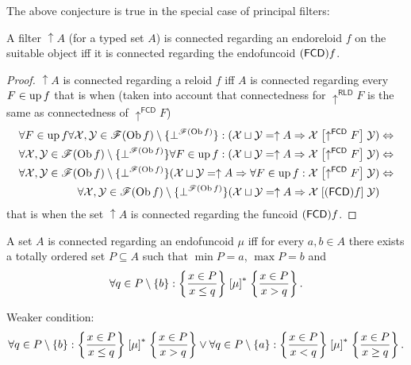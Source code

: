 The above conjecture is true in the special case of principal filters:
\begin{prop}
A filter $\uparrow A$ (for a typed set $A$) is connected regarding
an endoreloid $f$ on the suitable object iff it is connected regarding the endofuncoid $(\mathsf{FCD}) f$.\end{prop}
\begin{proof}
$\uparrow A$ is connected regarding a reloid $f$ iff $A$
is connected regarding every $F\in\operatorname{up} f$ that is when (taken into
account that connectedness for $\uparrow^{\mathsf{RLD}}F$ is the
same as connectedness of $\uparrow^{\mathsf{FCD}}F$)
\begin{align*}
\forall F\in\operatorname{up} f\forall\mathcal{X},\mathcal{Y}\in\mathscr{F}(\operatorname{Ob} f)\setminus\{\bot^{\mathscr{F}(\operatorname{Ob} f)}\}:(\mathcal{X}\sqcup\mathcal{Y}=\uparrow A\Rightarrow\mathcal{X}\mathrel{\left[\uparrow^{\mathsf{FCD}}F\right]}\mathcal{Y}) & \Leftrightarrow\\
\forall\mathcal{X},\mathcal{Y}\in\mathscr{F}(\operatorname{Ob} f)\setminus\{\bot^{\mathscr{F}(\operatorname{Ob} f)}\}\forall F\in\operatorname{up} f:(\mathcal{X}\sqcup\mathcal{Y}=\uparrow A\Rightarrow\mathcal{X}\mathrel{\left[\uparrow^{\mathsf{FCD}}F\right]}\mathcal{Y}) & \Leftrightarrow\\
\forall\mathcal{X},\mathcal{Y}\in\mathscr{F}(\operatorname{Ob} f)\setminus\{\bot^{\mathscr{F}(\operatorname{Ob} f)}\}(\mathcal{X}\sqcup\mathcal{Y}=\uparrow A\Rightarrow\forall F\in\operatorname{up} f:\mathcal{X}\mathrel{\left[\uparrow^{\mathsf{FCD}}F\right]}\mathcal{Y}) & \Leftrightarrow\\
\forall\mathcal{X},\mathcal{Y}\in\mathscr{F}(\operatorname{Ob} f)\setminus\{\bot^{\mathscr{F}(\operatorname{Ob} f)}\}(\mathcal{X}\sqcup\mathcal{Y}=\uparrow A\Rightarrow\mathcal{X}\mathrel{\left[(\mathsf{FCD}) f\right]}\mathcal{Y})
\end{align*}
that is when the set $\uparrow A$ is connected regarding
the funcoid $(\mathsf{FCD}) f$.\end{proof}
\begin{conjecture}
A set $A$ is connected regarding an endofuncoid $\mu$ iff for every
$a,b\in A$ there exists a totally ordered set $P\subseteq A$ such
that $\min P=a$, $\max P=b$ and
\[
\forall q\in P\setminus\{b\}:\left\{ \frac{x\in P}{x\le q}\right\}\mathrel{\left[\mu\right]^{\ast}}\left\{ \frac{x\in P}{x>q}\right\}.
\]


Weaker condition:
\[
\forall q\in P\setminus\{b\}:\left\{ \frac{x\in P}{x\le q}\right\}\mathrel{\left[\mu\right]^{\ast}}\left\{ \frac{x\in P}{x>q}\right\}\lor\forall q\in P\setminus\{a\}:\left\{ \frac{x\in P}{x<q}\right\}\mathrel{\left[\mu\right]^{\ast}}\left\{ \frac{x\in P}{x\ge q}\right\}.
\]

\end{conjecture}

